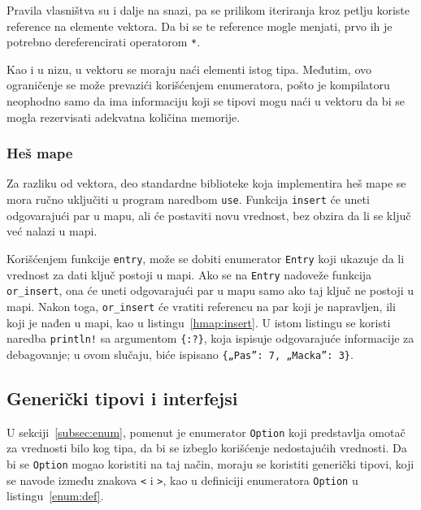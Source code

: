 \documentclass[12pt,oneside]{memoir}
\begin{document}
Pravila vlasništva su i dalje na snazi, pa se prilikom iteriranja kroz petlju
koriste reference na elemente vektora. Da bi se te reference mogle menjati, prvo
ih je potrebno dereferencirati operatorom \texttt{*}.



Kao i u nizu, u vektoru se moraju naći elementi istog tipa. Međutim, ovo
ograničenje se može prevazići korišćenjem enumeratora, pošto je kompilatoru
neophodno samo da ima informaciju koji se tipovi mogu naći u vektoru da bi se
mogla rezervisati adekvatna količina memorije.

\subsubsection{Heš mape}

Za razliku od vektora, deo standardne biblioteke koja implementira heš mape
se mora ručno uključiti u program naredbom \texttt{use}. Funkcija \texttt{insert} će uneti
odgovarajući par u mapu, ali će postaviti novu vrednost, bez obzira da li se ključ već
nalazi u mapi.

Korišćenjem funkcije \texttt{entry}, može se dobiti enumerator \texttt{Entry} koji ukazuje
da li vrednost za dati ključ postoji u mapi. Ako se na \texttt{Entry} nadoveže funkcija
\texttt{or\_insert}, ona će uneti odgovarajući par u mapu samo ako taj ključ ne postoji u
mapi. Nakon toga, \texttt{or\_insert} će vratiti referencu na par koji je napravljen, ili koji
je nađen u mapi, kao u listingu~\ref{hmap:insert}. U istom listingu se koristi naredba
\texttt{println!} sa argumentom \texttt{\{:?\}}, koja ispisuje odgovarajuće informacije
za debagovanje; u ovom slučaju, biće ispisano \texttt{\{„Pas”: 7, „Macka”: 3\}}.



\subsection{Generički tipovi i interfejsi}
U sekciji~\ref{subsec:enum}, pomenut je enumerator \texttt{Option} koji predstavlja
omotač za vrednosti bilo kog tipa, da bi se izbeglo korišćenje nedostajućih vrednosti.
Da bi se \texttt{Option} mogao koristiti na taj način, moraju se koristiti generički
tipovi, koji se navode između znakova \texttt{<} i \texttt{>}, kao u
definiciji enumeratora \texttt{Option} u listingu~\ref{enum:def}.
\end{document}
